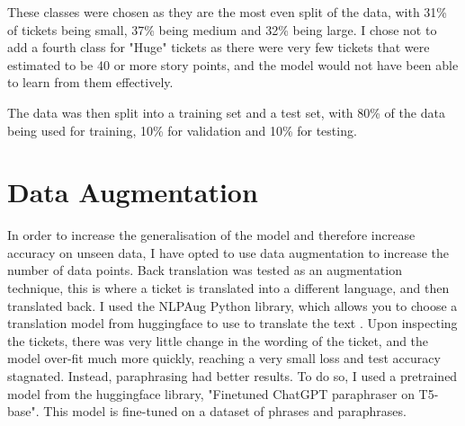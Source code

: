 \documentclass{UoYCSproject}
\begin{document}
    These classes were chosen as they are the most even split of the data, with 31\% of tickets being small, 37\% being medium and 32\% being large. I chose not to add a fourth class for "Huge" tickets as there were very few tickets that were estimated to be 40 or more story points, and the model would not have been able to learn from them effectively.

    The data was then split into a training set and a test set, with 80\% of the data being used for training, 10\% for validation and 10\% for testing.

%


    \section{Data Augmentation}\label{sec:data-augmentation}
    In order to increase the generalisation of the model and therefore increase accuracy on unseen data, I have opted to use data augmentation to increase the number of data points.
    Back translation was tested as an augmentation technique, this is where a ticket is translated into a different language, and then translated back.
    I used the NLPAug Python library, which allows you to choose a translation model from huggingface to use to translate the text \cite{ma2019nlpaug}.
    Upon inspecting the tickets, there was very little change in the wording of the ticket, and the model over-fit much more quickly, reaching a very small loss and test accuracy stagnated.
    Instead, paraphrasing had better results.
    To do so, I used a pretrained model from the huggingface library, "Finetuned ChatGPT paraphraser on T5-base". \cite{chatgpt_paraphraser}
    This model is fine-tuned on a dataset of phrases and paraphrases.
\end{document}
